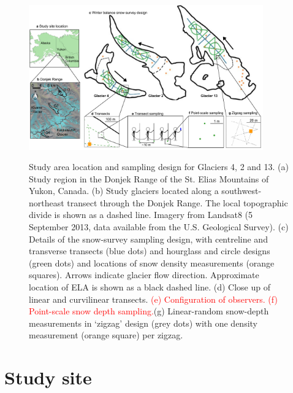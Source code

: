 \documentclass[twocolumn, letterpaper]{igs}
\begin{document}
\begin{figure}
	\centering
	\includegraphics[width =0.9\textwidth]{Sampling.pdf}\\
	\caption{Study area location and sampling design for Glaciers 4, 2 and 13. (a) Study region in the Donjek Range of the St. Elias Mountains of Yukon, Canada. (b) Study glaciers located along a southwest-northeast transect through the Donjek Range. The local topographic divide is shown as a dashed line. Imagery from Landsat8 (5 September 2013, data available from the U.S. Geological Survey). (c) Details of the snow-survey sampling design, with centreline and transverse transects (blue dots) and hourglass and circle designs (green dots) and locations of snow density measurements (orange squares). Arrows indicate glacier flow direction. Approximate location of ELA is shown as a black dashed line. (d) Close up of linear and curvilinear transects. \textcolor{red}{(e) Configuration of observers. (f) Point-scale snow depth sampling.}(g) Linear-random snow-depth measurements in `zigzag' design (grey dots) with one density measurement (orange square) per zigzag.}
	\label{fig:Sampling}
\end{figure}

\section{Study site}
\end{document}
